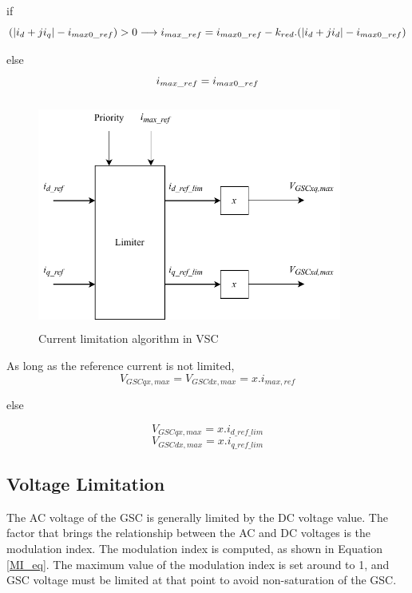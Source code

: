 if
\begin{equation} \label{currentlimeq1}
  (|i_d+ji_q|-i_{max0\_ref})>0 \longrightarrow i_{max\_ref} = i_{max0\_ref} - k_{red} .(|i_d+ji_d|-i_{max0\_ref}) \\
\end{equation}

else
\begin{equation}\label{currentlimeq2}
    \\
  i_{max\_ref} = i_{max0\_ref}  
 \end{equation}
 
\begin{figure}[H]
\centering
    \includegraphics[height = 7.5cm,width = 10cm]{Diagrams/Chapter_3/Current_Limiter_block.pdf}
    \caption{Current limitation algorithm in VSC \cite{korai_dynamic_2019}}
    \label{fig:Current_Limiter_block}
\end{figure}

As long as the reference current is not limited,
\begin{equation}\label{vol_lim_1}
    V_{GSCqx,max} = V_{GSCdx,max} = x . i_{max,ref}
\end{equation}

else

\begin{equation}\label{vol_lim_2}
    V_{GSCqx,max} = x . i_{d\_ref\_lim} 
\end{equation}
\begin{equation}\label{vol_lim_3}
    V_{GSCdx,max} = x . i_{q\_ref\_lim}
\end{equation}

\subsection{Voltage Limitation}
The \gls{AC} voltage of the \gls{GSC} is generally limited by the \gls{DC} voltage value. The factor that brings the relationship between the \gls{AC} and \gls{DC} voltages is the modulation index. The modulation index is computed, as shown in Equation \ref{MI_eq}. The maximum value of the modulation index is set around to 1, and \gls{GSC} voltage must be limited at that point to avoid non-saturation of the \gls{GSC}. 

